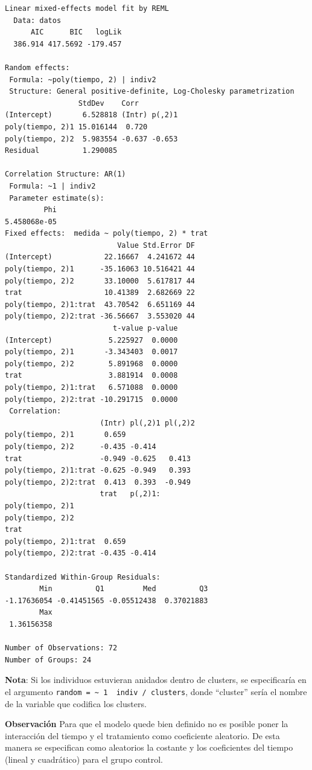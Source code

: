 \documentclass[
]{book}
\begin{document}
\begin{verbatim}
Linear mixed-effects model fit by REML
  Data: datos 
      AIC      BIC   logLik
  386.914 417.5692 -179.457

Random effects:
 Formula: ~poly(tiempo, 2) | indiv2
 Structure: General positive-definite, Log-Cholesky parametrization
                 StdDev    Corr         
(Intercept)       6.528818 (Intr) p(,2)1
poly(tiempo, 2)1 15.016144  0.720       
poly(tiempo, 2)2  5.983554 -0.637 -0.653
Residual          1.290085              

Correlation Structure: AR(1)
 Formula: ~1 | indiv2 
 Parameter estimate(s):
         Phi 
5.458068e-05 
Fixed effects:  medida ~ poly(tiempo, 2) * trat 
                          Value Std.Error DF
(Intercept)            22.16667  4.241672 44
poly(tiempo, 2)1      -35.16063 10.516421 44
poly(tiempo, 2)2       33.10000  5.617817 44
trat                   10.41389  2.682669 22
poly(tiempo, 2)1:trat  43.70542  6.651169 44
poly(tiempo, 2)2:trat -36.56667  3.553020 44
                         t-value p-value
(Intercept)             5.225927  0.0000
poly(tiempo, 2)1       -3.343403  0.0017
poly(tiempo, 2)2        5.891968  0.0000
trat                    3.881914  0.0008
poly(tiempo, 2)1:trat   6.571088  0.0000
poly(tiempo, 2)2:trat -10.291715  0.0000
 Correlation: 
                      (Intr) pl(,2)1 pl(,2)2
poly(tiempo, 2)1       0.659                
poly(tiempo, 2)2      -0.435 -0.414         
trat                  -0.949 -0.625   0.413 
poly(tiempo, 2)1:trat -0.625 -0.949   0.393 
poly(tiempo, 2)2:trat  0.413  0.393  -0.949 
                      trat   p(,2)1:
poly(tiempo, 2)1                    
poly(tiempo, 2)2                    
trat                                
poly(tiempo, 2)1:trat  0.659        
poly(tiempo, 2)2:trat -0.435 -0.414 

Standardized Within-Group Residuals:
        Min          Q1         Med          Q3 
-1.17636054 -0.41451565 -0.05512438  0.37021883 
        Max 
 1.36156358 

Number of Observations: 72
Number of Groups: 24 
\end{verbatim}

\textbf{Nota}:
Si los individuos estuvieran anidados dentro de clusters, se especificaría en el argumento \texttt{random\ =\ \textasciitilde{}\ 1\ \textbar{}\ indiv\ /\ clusters}, donde ``cluster'' sería el nombre de la variable que codifica los clusters.

\textbf{Observación} Para que el modelo quede bien definido no es posible poner la interacción del tiempo y el tratamiento como coeficiente aleatorio. De esta manera se especifican como aleatorios la costante y los coeficientes del tiempo (lineal y cuadrático) para el grupo control.
\end{document}
